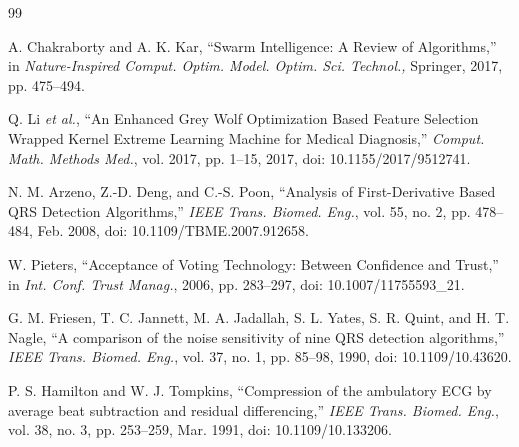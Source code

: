 \documentclass{iaesarticle}
\begin{document}



%


\begin{thebibliography} {99} 
\footnotesize
\itemsep 0pt 




  A. Chakraborty and A. K. Kar, “Swarm Intelligence: A Review of Algorithms,” in \textsl{Nature-Inspired Comput. Optim. Model. Optim. Sci. Technol.,} Springer, 2017, pp. 475–494.

 Q. Li \textsl{et al.}, “An Enhanced Grey Wolf Optimization Based Feature Selection Wrapped Kernel Extreme Learning Machine for Medical Diagnosis,” \textsl{Comput. Math. Methods Med.}, vol. 2017, pp. 1–15, 2017, doi: 10.1155/2017/9512741.

 N. M. Arzeno, Z.-D. Deng, and C.-S. Poon, “Analysis of First-Derivative Based QRS Detection Algorithms,” \textsl{IEEE Trans. Biomed. Eng.}, vol. 55, no. 2, pp. 478–484, Feb. 2008, doi: 10.1109/TBME.2007.912658.

 W. Pieters, “Acceptance of Voting Technology: Between Confidence and Trust,” in \textsl{Int. Conf. Trust Manag.}, 2006, pp. 283–297, doi: 10.1007/11755593\_21.

 G. M. Friesen, T. C. Jannett, M. A. Jadallah, S. L. Yates, S. R. Quint, and H. T. Nagle, “A comparison of the noise sensitivity of nine QRS detection algorithms,” \textsl{IEEE Trans. Biomed. Eng.}, vol. 37, no. 1, pp. 85–98, 1990, doi: 10.1109/10.43620.

 P. S. Hamilton and W. J. Tompkins, “Compression of the ambulatory ECG by average beat subtraction and residual differencing,” \textsl{IEEE Trans. Biomed. Eng.}, vol. 38, no. 3, pp. 253–259, Mar. 1991, doi: 10.1109/10.133206.


\end{thebibliography}
\end{document}
